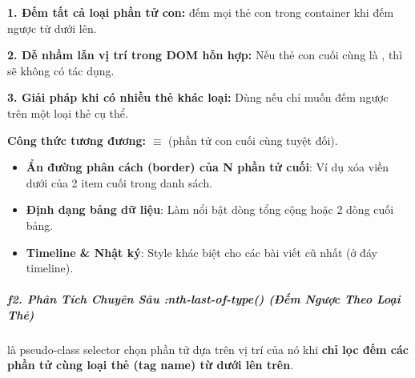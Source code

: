 \begin{warnBox}
\textbf{1. Đếm tất cả loại phần tử con:}  đếm mọi thẻ con trong container khi đếm ngược từ dưới lên.
\par\vspace{4pt}
\textbf{2. Dễ nhầm lẫn vị trí trong DOM hỗn hợp:} Nếu thẻ con cuối cùng là , thì  sẽ không có tác dụng.
\par\vspace{4pt}
\textbf{3. Giải pháp khi có nhiều thẻ khác loại:} Dùng  nếu chỉ muốn đếm ngược trên một loại thẻ cụ thể.
\end{warnBox}

\begin{tipBox}
\textbf{Công thức tương đương:}  $\equiv$  (phần tử con cuối cùng tuyệt đối).
\end{tipBox}

\begin{conceptBox}
\begin{itemize}[leftmargin=1.5em, itemsep=3pt, parsep=0pt]
    \item \textbf{Ẩn đường phân cách (border) của N phần tử cuối}: Ví dụ xóa viền dưới của 2 item cuối trong danh sách.
    \item \textbf{Định dạng bảng dữ liệu}: Làm nổi bật dòng tổng cộng hoặc 2 dòng cuối bảng.
    \item \textbf{Timeline \& Nhật ký}: Style khác biệt cho các bài viết cũ nhất (ở đáy timeline).
\end{itemize}
\end{conceptBox}


\subparagraph{f2. Phân Tích Chuyên Sâu :nth-last-of-type() (Đếm Ngược Theo Loại Thẻ)}

 là pseudo-class selector chọn phần tử dựa trên vị trí của nó khi \textbf{chỉ lọc đếm các phần tử cùng loại thẻ (tag name) từ dưới lên trên}.

